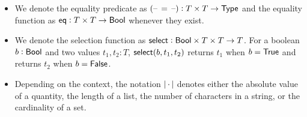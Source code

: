 \begin{itemize}
    \item We denote the equality predicate as $({\textrm{--}}\,=\,{\textrm{--}}) : T \times T \to {\textsf{Type}}$ and the equality function as ${\textsf{eq}} : T \times T \to {\textsf{Bool}}$ whenever they exist.
    \item We denote the selection function as ${\textsf{select}}: {\textsf{Bool}} \times T \times T \to T$. For a boolean $b: {\textsf{Bool}}$ and two values $t_1, t_2 : T$, ${\textsf{select}}(b, t_1, t_2)$ returns $t_1$ when $b={\textsf{True}}$ and returns $t_2$ when $b={\textsf{False}}$.
    \item Depending on the context, the notation $\left|\,\cdot\,\right|$ denotes either the absolute value of a quantity, the length of a list, the number of characters in a string, or the cardinality of a set.
\end{itemize}

